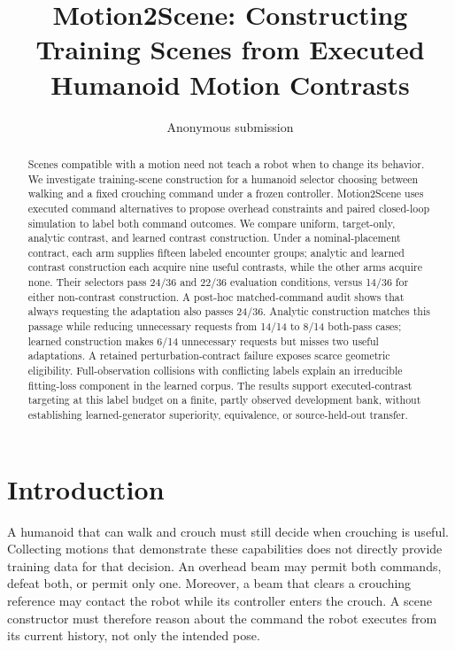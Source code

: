 \documentclass[letterpaper,10pt,conference]{ieeeconf}
\title{Motion2Scene: Constructing Training Scenes from Executed Humanoid Motion Contrasts}
\author{Anonymous submission}
\begin{document}
\maketitle
\thispagestyle{empty}
\pagestyle{empty}

\begin{abstract}
Scenes compatible with a motion need not teach a robot when to change its behavior.
We investigate training-scene construction for a humanoid selector choosing between
walking and a fixed crouching command under a frozen controller. Motion2Scene uses
executed command alternatives to propose overhead constraints and paired closed-loop
simulation to label both command outcomes. We compare uniform, target-only, analytic
contrast, and learned contrast construction. Under a nominal-placement contract,
each arm supplies fifteen labeled encounter groups; analytic and learned contrast
construction each acquire nine useful contrasts, while the other arms acquire none.
Their selectors pass 24/36 and 22/36 evaluation conditions, versus 14/36 for either
non-contrast construction. A post-hoc matched-command audit shows that always
requesting the adaptation also passes 24/36. Analytic construction matches this
passage while reducing unnecessary requests from 14/14 to 8/14 both-pass cases;
learned construction makes 6/14 unnecessary requests but misses two useful
adaptations. A retained perturbation-contract failure exposes scarce geometric
eligibility. Full-observation collisions with conflicting labels explain an
irreducible fitting-loss component in the learned corpus. The results support
executed-contrast targeting at this label budget on a finite, partly observed
development bank, without establishing learned-generator superiority, equivalence,
or source-held-out transfer.
\end{abstract}

\section{Introduction}
A humanoid that can walk and crouch must still decide when crouching is useful.
Collecting motions that demonstrate these capabilities does not directly provide
training data for that decision. An overhead beam may permit both commands,
defeat both, or permit only one. Moreover, a beam that clears a crouching reference
may contact the robot while its controller enters the crouch. A scene constructor
must therefore reason about the command the robot executes from its current
history, not only the intended pose.
\end{document}
